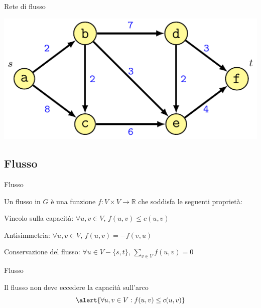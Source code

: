 \begin{frame}{Rete di flusso}

\includegraphics[width=1.0\textwidth]{template.pdf}

\end{frame}

\subsection{Flusso}

\begin{frame}{Flusso}

\vspace{-9pt}
\begin{myboxtitle}[Flusso]
Un \alert{flusso} in $G$ è una funzione \alert{$f: V \times V \rightarrow \mathbb{R}$} 
che soddisfa le seguenti proprietà:
\BIL
\item \alert{Vincolo sulla capacità}: $\forall u,v \in V$, $f(u,v) \leq c(u,v)$

\item \alert{Antisimmetria}: $\forall u,v \in V$, $f(u,v) = -f(v,u)$

\item \alert{Conservazione del flusso}: $\forall u \in V-\{s,t\}$, 
$\sum_{v \in V} f(u,v) = 0$
\EIL
\end{myboxtitle}

\end{frame}

\begin{frame}{Flusso}

\vspace{-9pt}
\begin{myboxtitle}
Il flusso non deve eccedere la capacità sull'arco
\[
\alert{\forall u,v \in V: f(u,v) \leq c(u,v)}
\]
\end{myboxtitle}

\smallskip
\begin{center}
\end{center}

\end{frame}


